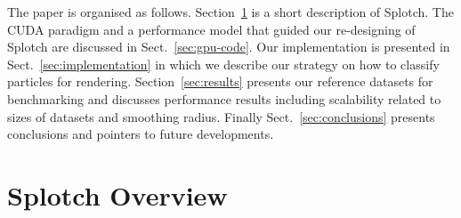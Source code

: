 \documentclass[preprint,5pt]{elsarticle}
\begin{document}
The paper is organised as follows. 
Section~\ref{sec:overview} is a short description of Splotch. The CUDA paradigm and a performance model that guided our re-designing of Splotch are discussed in Sect.~\ref{sec:gpu-code}. Our implementation is presented in Sect.~\ref{sec:implementation} in which we describe our strategy on how to classify particles for rendering. Section~\ref{sec:results} presents our reference datasets for benchmarking and discusses performance results including scalability related to sizes of datasets and smoothing radius. Finally Sect.~\ref{sec:conclusions} presents conclusions and pointers to future developments.

\section{Splotch Overview}
\label{sec:overview}
\end{document}
